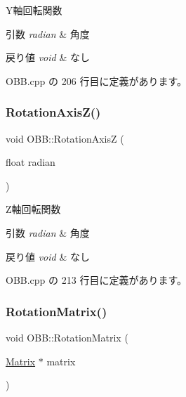 Y軸回転関数 


\begin{DoxyParams}{引数}
{\em radian} & 角度 \\
\hline
\end{DoxyParams}

\begin{DoxyRetVals}{戻り値}
{\em void} & なし \\
\hline
\end{DoxyRetVals}


 O\+B\+B.\+cpp の 206 行目に定義があります。

\mbox{\label{class_o_b_b_a364e56977bd0bd6a9f1e62ea700dfc09}} 
\subsubsection{\texorpdfstring{Rotation\+Axis\+Z()}{RotationAxisZ()}}
{\footnotesize\ttfamily void O\+B\+B\+::\+Rotation\+AxisZ (\begin{DoxyParamCaption}\item[{float}]{radian }\end{DoxyParamCaption})}



Z軸回転関数 


\begin{DoxyParams}{引数}
{\em radian} & 角度 \\
\hline
\end{DoxyParams}

\begin{DoxyRetVals}{戻り値}
{\em void} & なし \\
\hline
\end{DoxyRetVals}


 O\+B\+B.\+cpp の 213 行目に定義があります。

\mbox{\label{class_o_b_b_ab08a8afd6b8d5c140e25d6f9665c9bf5}} 
\subsubsection{\texorpdfstring{Rotation\+Matrix()}{RotationMatrix()}}
{\footnotesize\ttfamily void O\+B\+B\+::\+Rotation\+Matrix (\begin{DoxyParamCaption}\item[{\mbox{\hyperlink{class_matrix}{Matrix}} $\ast$}]{matrix }\end{DoxyParamCaption})}



